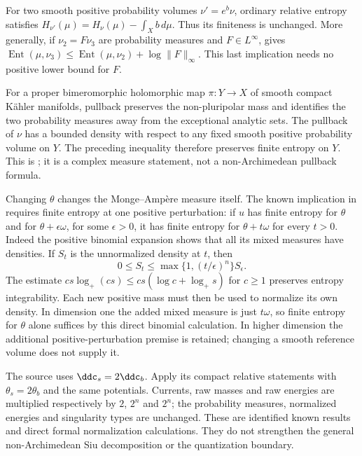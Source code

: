For two smooth positive probability volumes
$\nu'=e^b\nu$, ordinary relative entropy satisfies
$H_{\nu'}(\mu)=H_\nu(\mu)-\int_Xb\,d\mu$.
Thus its finiteness is unchanged. More generally, if
$\nu_2=F\nu_3$ are probability measures and $F\in L^\infty$,
\cite[Lemma~3.9]{DNTT24EntropyPublished} gives
$\operatorname{Ent}(\mu,\nu_3)
 \leq\operatorname{Ent}(\mu,\nu_2)+\log\|F\|_\infty$.
This last implication needs no positive lower bound for $F$.

For a proper bimeromorphic holomorphic map $\pi:Y\to X$ of smooth
compact K\"ahler manifolds, pullback preserves the non-pluripolar mass
and identifies the two probability measures away from the exceptional
analytic sets. The pullback of $\nu$ has a bounded density with respect
to any fixed smooth positive probability volume on $Y$.
The preceding inequality therefore preserves finite entropy on $Y$.
This is \cite[Proposition~3.10]{DNTT24EntropyPublished}; it is a
complex measure statement, not a non-Archimedean pullback formula.

Changing $\theta$ changes the Monge--Amp\`ere measure itself.
The known implication in
\cite[Proposition~3.12]{DNTT24EntropyPublished} requires finite entropy
at one positive perturbation: if $u$ has finite entropy for $\theta$
and for $\theta+\epsilon\omega$, for some $\epsilon>0$, it has finite
entropy for $\theta+t\omega$ for every $t>0$.
Indeed the positive binomial expansion shows that all its mixed measures
have densities. If $S_t$ is the unnormalized density at $t$, then
\[
\tag{65.71}\label{eq:rf-relative-entropy-perturbation}
 0\leq S_t\leq
  \max\{1,(t/\epsilon)^n\}S_\epsilon.
\]
The estimate
$cs\log_+(cs)\leq cs(\log c+\log_+s)$ for $c\geq1$ preserves
entropy integrability. Each new positive mass must then be used to
normalize its own density. In dimension one the added mixed measure
is just $t\omega$, so finite entropy for $\theta$ alone suffices by
this direct binomial calculation. In higher dimension the additional
positive-perturbation premise is retained; changing a smooth reference
volume does not supply it.

The source uses $\ddc_s=2\ddc_b$. Apply its compact relative statements
with $\theta_s=2\theta_b$ and the same potentials. Currents, raw masses
and raw energies are multiplied respectively by $2$, $2^n$ and $2^n$;
the probability measures, normalized energies and singularity types are
unchanged. These are identified known results and direct formal
normalization calculations. They do not strengthen the general
non-Archimedean Siu decomposition or the quantization boundary.

